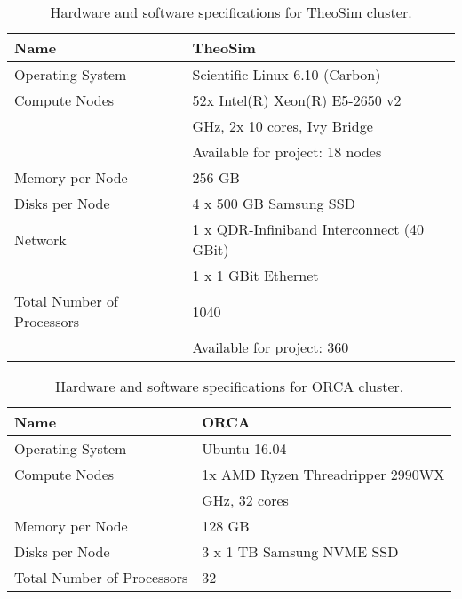 \documentclass[3p]{elsarticle}
\begin{document}
\begin{table}[ht!]
    \centering
    \begin{tabular}{ l | l }
        Name                        & TheoSim \\
        \hline\hline
        Operating System            & Scientific Linux 6.10 (Carbon) \\
        Compute Nodes               & 52x Intel(R) Xeon(R) E5-2650 v2 \\
                                    & \qquad 2.8 GHz, 2x 10 cores, Ivy Bridge \\
                                    & \qquad Available for project: 18 nodes \\
        Memory per Node             & 256 GB \\
        Disks per Node              & 4 x 500 GB Samsung SSD \\
        Network                     & 1 x QDR-Infiniband Interconnect (40 GBit) \\
                                    & 1 x 1 GBit Ethernet \\
        Total Number of Processors  & 1040 \\
                                    & \qquad Available for project: 360 \\
    \end{tabular}
    \caption{Hardware and software specifications for TheoSim cluster.}
\end{table}
\begin{table}[ht!]
    \centering
    \begin{tabular}{ l | l }
        Name                        & ORCA \\
        \hline\hline
        Operating System            & Ubuntu 16.04 \\
        Compute Nodes               & 1x AMD Ryzen Threadripper 2990WX \\
                                    & \qquad 3.0 GHz, 32 cores \\
        Memory per Node             & 128 GB \\
        Disks per Node              & 3 x 1 TB Samsung NVME SSD \\
        Total Number of Processors  & 32 \\
    \end{tabular}
    \caption{Hardware and software specifications for ORCA cluster.}
\end{table}
\end{document}
